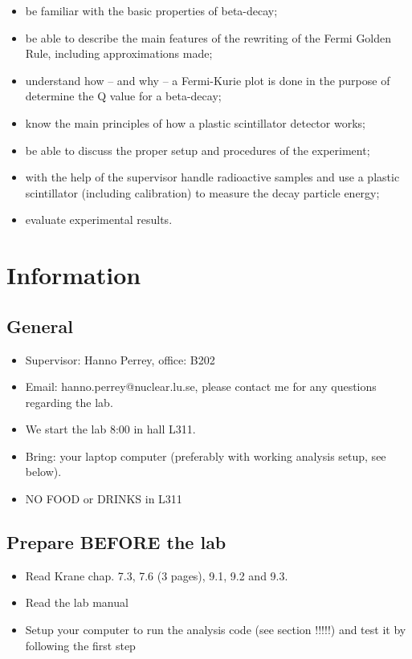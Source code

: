 \documentclass[a4,11pt, notitlepage]{article}
\begin{document}
\begin{itemize}
\item be familiar with the basic properties of beta-decay;
\item be able to describe the main features of the rewriting of the
  Fermi Golden Rule, including approximations made;
\item understand how -- and why -- a Fermi-Kurie plot is done in the purpose
  of determine the Q value for a beta-decay;
\item know the main principles of how a plastic scintillator detector works;
\item be able to discuss the proper setup and procedures of the experiment;
\item with the help of the supervisor handle radioactive samples and use a
  plastic scintillator (including calibration) to measure the decay particle energy;
\item evaluate experimental results.
\end{itemize}

\pagebreak
\section{Information}


\subsection{General}

\begin{itemize}
\item Supervisor: Hanno Perrey, office: B202
\item Email: hanno.perrey@nuclear.lu.se, please contact me for any questions regarding the lab. 
\item We start the lab 8:00 in hall L311. 
\item Bring: your laptop computer (preferably with working
  analysis setup, see below). 
\item NO FOOD or DRINKS in L311
\end{itemize}



\subsection{Prepare BEFORE the lab}

\begin{itemize}
\item Read Krane chap. 7.3, 7.6 (3 pages), 9.1, 9.2 and 9.3. 
\item Read the lab manual
\item Setup your computer to run the analysis code (see section !!!!!)
  and test it by following the first step
\end{itemize}
\end{document}
